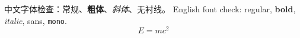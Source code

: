 \documentclass[UTF8,fontset=fandol,scheme=plain]{ctexart}
\begin{document}
中文字体检查：常规、\textbf{粗体}、\textit{斜体}、\textsf{无衬线}。
English font check: regular, \textbf{bold}, \textit{italic}, \textsf{sans}, \texttt{mono}.
\[
  E = mc^2
\]
\end{document}
